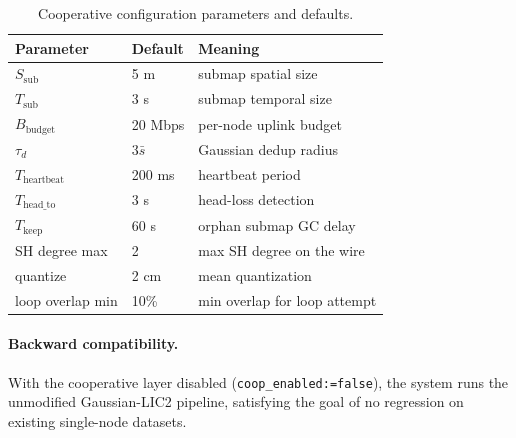 \begin{table}[t]
  \centering
  \caption{Cooperative configuration parameters and defaults.}
  \label{tab:config}
  \small
  \begin{tabular}{lll}
    \toprule
    Parameter & Default & Meaning \\
    \midrule
    $S_{\text{sub}}$       & 5 m    & submap spatial size \\
    $T_{\text{sub}}$       & 3 s    & submap temporal size \\
    $B_{\text{budget}}$    & 20 Mbps & per-node uplink budget \\
    $\tau_d$               & $3\bar{s}$ & Gaussian dedup radius \\
    $T_{\text{heartbeat}}$ & 200 ms & heartbeat period \\
    $T_{\text{head\_to}}$  & 3 s    & head-loss detection \\
    $T_{\text{keep}}$      & 60 s   & orphan submap GC delay \\
    SH degree max          & 2      & max SH degree on the wire \\
    quantize               & 2 cm   & mean quantization \\
    loop overlap min       & 10\%   & min overlap for loop attempt \\
    \bottomrule
  \end{tabular}
\end{table}

\paragraph{Backward compatibility.} With the cooperative layer disabled
(\texttt{coop\_enabled:=false}), the system runs the unmodified Gaussian-LIC2
pipeline, satisfying the goal of no regression on existing single-node
datasets.
